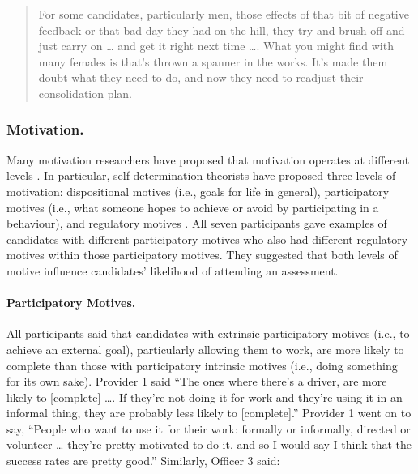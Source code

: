 \documentclass[
  12pt,
  a4paper,
]{book}
\begin{document}
\begin{quote}
For some candidates, particularly men, those effects of that bit of negative feedback or that bad day they had on the hill, they try and brush off and just carry on \ldots{} and get it right next time \ldots. What you might find with many females is that's thrown a spanner in the works. It's made them doubt what they need to do, and now they need to readjust their consolidation plan.
\end{quote}

\hypertarget{qual-gta-motivation}{%
\subsubsection{Motivation.}\label{qual-gta-motivation}}

Many motivation researchers have proposed that motivation operates at different levels \citep[e.g.,][]{Vallerand1997, Vallerand1992}. In particular, self-determination theorists have proposed three levels of motivation: dispositional motives (i.e., goals for life in general), participatory motives (i.e., what someone hopes to achieve or avoid by participating in a behaviour), and regulatory motives \citep[i.e., the perceived loci of causality of behavioural goals; e.g.,][]{Deci2000, Ingledew2009}. All seven participants gave examples of candidates with different participatory motives who also had different regulatory motives within those participatory motives. They suggested that both levels of motive influence candidates' likelihood of attending an assessment.

\hypertarget{qual-part-motives}{%
\paragraph{Participatory Motives.}\label{qual-part-motives}}

All participants said that candidates with extrinsic participatory motives (i.e., to achieve an external goal), particularly allowing them to work, are more likely to complete than those with participatory intrinsic motives (i.e., doing something for its own sake). Provider 1 said ``The ones where there's a driver, are more likely to {[}complete{]} \ldots. If they're not doing it for work and they're using it in an informal thing, they are probably less likely to {[}complete{]}.'' Provider 1 went on to say, ``People who want to use it for their work: formally or informally, directed or volunteer \ldots{} they're pretty motivated to do it, and so I would say I think that the success rates are pretty good.'' Similarly, Officer 3 said:
\end{document}
